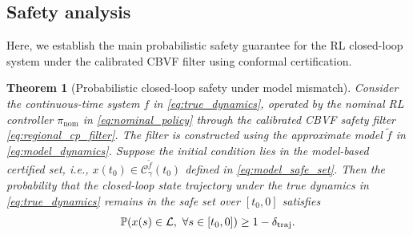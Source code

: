 \documentclass[letterpaper,10pt,conference]{ieeeconf}
\newtheorem{theorem}{Theorem}
\newcommand{\PP}{\mathbb{P}}
\newcommand{\fapp}{\widetilde{f}}
\newcommand{\safe}{\mathcal{L}}
\newcommand{\xv}{x}
\begin{document}


\subsection{Safety analysis}
Here, we establish the main probabilistic safety guarantee for the RL closed-loop system under the calibrated CBVF filter using conformal certification.


\begin{theorem}[Probabilistic closed-loop safety under model mismatch]
\label{thm:covered_mismatch_safety}
Consider the continuous-time system $f$ in \eqref{eq:true_dynamics}, operated by
the nominal RL controller $\pi_{\mathrm{nom}}$ in
\eqref{eq:nominal_policy} through the calibrated CBVF safety filter
\eqref{eq:regional_cp_filter}. The filter is constructed using the
approximate model $\fapp$ in \eqref{eq:model_dynamics}. Suppose the initial
condition lies in the model-based certified set, i.e.,
$\xv(t_0)\in\mathcal C_{\gamma}^{\tilde f}(t_0)$ defined in
\eqref{eq:model_safe_set}.
Then the probability that the closed-loop state trajectory under the true
dynamics in \eqref{eq:true_dynamics} remains in the safe set over $[t_0,0]$
satisfies
\begin{equation}
\PP\!\left(
\xv(s)\in\safe,\ \forall s\in[t_0,0]
\right)
\geq
1-\delta_{\rm traj}.
\label{eq:calibrated_probabilistic_safety}
\end{equation}
\end{theorem}
\end{document}
